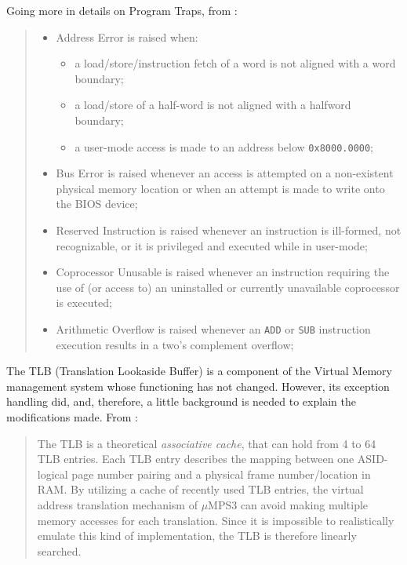 \documentclass[12pt,a4paper,openright,twoside]{report}
\begin{document}
Going more in details on Program Traps, from \cite{pops}:
\begin{quote}
	\begin{itemize}
		\item Address Error is raised when:
		      \begin{itemize}
			      \item a load/store/instruction fetch of a word is not aligned with a word boundary;
			      \item a load/store of a half-word is not aligned with a halfword boundary;
			      \item a user-mode access is made to an address below \texttt{0x8000.0000};
		      \end{itemize}
		\item Bus Error is raised whenever an access is attempted on a non-existent physical memory location or when an attempt is made to write onto the BIOS device;
		\item Reserved Instruction is raised whenever an instruction is ill-formed, not recognizable, or it is privileged and executed while in user-mode;
		\item Coprocessor Unusable is raised whenever an instruction requiring the use of (or access to) an uninstalled or currently unavailable coprocessor is executed;
		\item Arithmetic Overflow is raised whenever an \texttt{ADD} or \texttt{SUB} instruction execution results in a two's complement overflow;
	\end{itemize}
\end{quote}

The TLB (Translation Lookaside Buffer) is a component of the Virtual Memory management system whose functioning has not changed.
However, its exception handling did, and, therefore, a little background is needed to explain the modifications made.
From \cite{pops}:
\begin{quote}
	The TLB is a theoretical \textit{associative cache}, that can hold from 4 to 64 TLB entries.
	Each TLB entry describes the mapping between one ASID-logical page number pairing and a physical frame number/location in RAM.
	By utilizing a cache of recently used TLB entries, the virtual address translation mechanism of $\mu$MPS3 can avoid making multiple memory accesses for each translation.
	Since it is impossible to realistically emulate this kind of implementation, the TLB is therefore linearly searched.
\end{quote}
\end{document}

